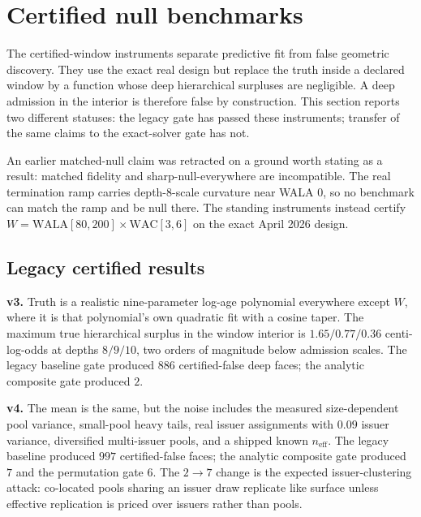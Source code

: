 \documentclass[11pt]{article}
\begin{document}
\section{Certified null benchmarks}\label{sec:certnull}
The certified-window instruments separate predictive fit from false geometric discovery. They use
the exact real design but replace the truth inside a declared window by a function whose deep
hierarchical surpluses are negligible. A deep admission in the interior is therefore false by
construction. This section reports two different statuses: the legacy gate has passed these
instruments; transfer of the same claims to the exact-solver gate has not.

An earlier matched-null claim was retracted on a ground worth stating as a result: matched fidelity
and sharp-null-everywhere are incompatible. The real termination ramp carries depth-8-scale
curvature near WALA $0$, so no benchmark can match the ramp and be null there. The standing
instruments instead certify
$W=\mathrm{WALA}[80,200]\times\mathrm{WAC}[3,6]$ on the exact April 2026 design.

\subsection*{Legacy certified results}
\textbf{v3.} Truth is a realistic nine-parameter log-age polynomial everywhere except $W$, where it
is that polynomial's own quadratic fit with a cosine taper. The maximum true hierarchical surplus
in the window interior is $1.65/0.77/0.36$ centi-log-odds at depths $8/9/10$, two orders of magnitude
below admission scales. The legacy baseline gate produced $886$ certified-false deep faces; the
analytic composite gate produced $2$.

\textbf{v4.} The mean is the same, but the noise includes the measured size-dependent pool variance,
small-pool heavy tails, real issuer assignments with $0.09$ issuer variance, diversified
multi-issuer pools, and a shipped known $n_{\mathrm{eff}}$. The legacy baseline produced $997$
certified-false faces; the analytic composite gate produced $7$ and the permutation gate $6$. The
$2\to7$ change is the expected issuer-clustering attack: co-located pools sharing an issuer draw
replicate like surface unless effective replication is priced over issuers rather than pools.
\end{document}

